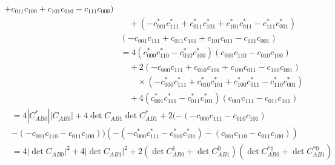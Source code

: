\begin{equation}
\begin{aligned}
		+ c_{011} c_{100}
		+ c_{101} c_{010}
		- c_{111} c_{000}) \\
		&\quad + (-c^{*}_{001} c^{*}_{111}
		+ c^{*}_{011} c^{*}_{101}
		+ c^{*}_{101} c^{*}_{011}
		- c^{*}_{111} c^{*}_{001})\\
		&(-c_{001} c_{111}
		+ c_{011} c_{101}
		+ c_{101} c_{011}
		- c_{111} c_{001})\\
		&= 4 (c^{*}_{000} c^{*}_{110}
		- c^{*}_{010} c^{*}_{100})
		(c_{000} c_{110}
		- c_{010} c_{100}) \\
		&\quad + 2 (-c_{000} c_{111}
		+ c_{010} c_{101}
		+ c_{100} c_{011}
		- c_{110} c_{001}) \\
		&\qquad \times
		(-c^{*}_{000} c^{*}_{111}
		+ c^{*}_{010} c^{*}_{101}
		+ c^{*}_{100} c^{*}_{011}
		- c^{*}_{110} c^{*}_{001}) \\
		&\quad + 4 (c^{*}_{001} c^{*}_{111}
		- c^{*}_{011} c^{*}_{101})
		(c_{001} c_{111}
		- c_{011} c_{101})
	\end{aligned}
\end{equation}
\begin{equation}
	\begin{aligned}
		&= 4 |C_{AB0}^{*}| |C_{AB0}|+ 4 \det C_{AB1} \det C_{AB1}^{*}+2(-(-c_{000}c_{111}-c_{010}c_{101})\\
		&-(-c_{001}c_{110}-c_{011}c_{100}))(-(-c^{*}_{000} c^{*}_{111}-c^{*}_{010} c^{*}_{101})-(c_{001}c_{110}-c_{011}c_{100}))\\
		&= 4 |\det C_{AB0}|^2
		+ 4 |\det C_{AB1}|^2
		+ 2 (\det C_{AB0}^1 + \det C_{AB1}^0)(\det C^{*1}_{AB0} + \det C^{*0}_{AB1})
	\end{aligned}
\end{equation}